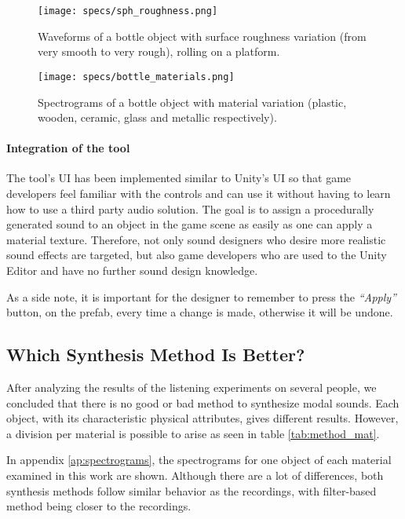\begin{figure}[H]
  \centering
    \texttt{[image: specs/sph\_roughness.png]}
      \caption{Waveforms of a bottle object with surface roughness variation (from very smooth to very rough), rolling on a platform.}
      \label{fig:bottle_rough}
\end{figure}

\begin{figure}[H]
  \centering
    \texttt{[image: specs/bottle\_materials.png]}
      \caption{Spectrograms of a bottle object with material variation (plastic, wooden, ceramic, glass and metallic respectively).}
      \label{fig:bottle_materials}
\end{figure}

\paragraph{Integration of the tool\\}

The tool's \gls{UI} has been implemented similar to Unity\textsuperscript{\textregistered}'s \gls{UI} so that game developers feel familiar with the controls and can use it without having to learn how to use a third party audio solution. The goal is to assign a procedurally generated sound to an object in the game scene as easily  as one can apply a material texture. Therefore, not only sound designers who desire more realistic sound effects are targeted, but also game developers who are used to the Unity\textsuperscript{\textregistered} Editor and have no further sound design knowledge. 

As a side note, it is important for the designer to remember to press the \textit{``Apply''} button, on the prefab, every time a change is made, otherwise it will be undone. 

\subsection{Which Synthesis Method Is Better?}
After analyzing the results of the listening experiments on several people, we concluded that there is no good or bad method to synthesize modal sounds. Each object, with its characteristic physical attributes, gives different results. However, a division per material is possible to arise as seen in table \ref{tab:method_mat}.

In appendix \ref{ap:spectrograms}, the spectrograms for one object of each material examined in this work are shown. Although there are a lot of differences, both synthesis methods follow similar behavior as the recordings, with filter-based method being closer to the recordings.

